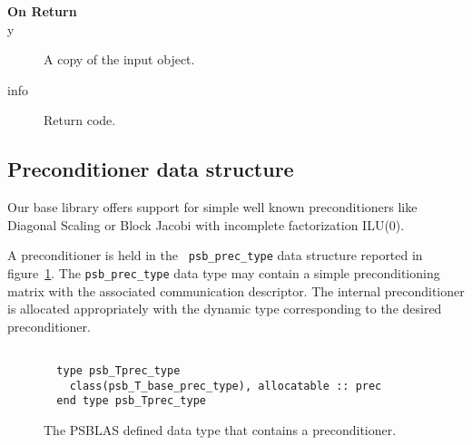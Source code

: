 \begin{description}
\item[\bf On Return]
\item[y] A copy of the input object.
\item[info] Return code. 
\end{description}


\subsection{Preconditioner data structure}
\label{sec:prec}
Our base library  offers support for  simple well known preconditioners
like Diagonal Scaling or Block Jacobi with incomplete
factorization ILU(0). 

 A preconditioner is held in the \hypertarget{precdata}{{\tt
    psb\_prec\_type}} data structure reported in 
figure~\ref{fig:prectype}. The \verb|psb_prec_type| 
data type may contain a simple preconditioning matrix with the
associated communication descriptor.%
The internal preconditioner is allocated appropriately with the
dynamic type corresponding to the desired preconditioner. 
\begin{figure}[h!]
  \small
\begin{center}
    \begin{minipage}[tl]{0.9\textwidth}
\begin{verbatim}

  type psb_Tprec_type
    class(psb_T_base_prec_type), allocatable :: prec
  end type psb_Tprec_type

\end{verbatim}
    \end{minipage}
  \end{center}
  \caption{\label{fig:prectype}The PSBLAS defined data type that contains a preconditioner.}
\end{figure}

